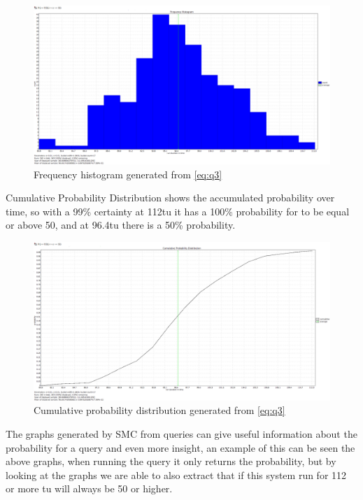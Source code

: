 \begin{figure}[!h]
	\includegraphics[width=\textwidth]{graphics/eq3fh.png}
	\caption{Frequency histogram generated from \cref{eq:q3}}
	\label{fig:eq3fh}
\end{figure}

Cumulative Probability Distribution shows the accumulated probability over time, so with a 99\% certainty at 112\gls{tu} it has a 100\% probability for  to be equal or above 50, and at 96.4\gls{tu} there is a 50\% probability.

\begin{figure}[!h]
	\includegraphics[width=\textwidth]{graphics/eq3cpd.png}
	\caption{Cumulative probability distribution generated from \cref{eq:q3}}
	\label{fig:eq3cpd}
\end{figure}

The graphs generated by SMC from queries can give useful information about the probability for a query and even more insight, an example of this can be seen the above graphs, when running the query it only returns the probability, but by looking at the graphs we are able to also extract that if this system run for 112 or more \gls{tu}  will always be 50 or higher.

